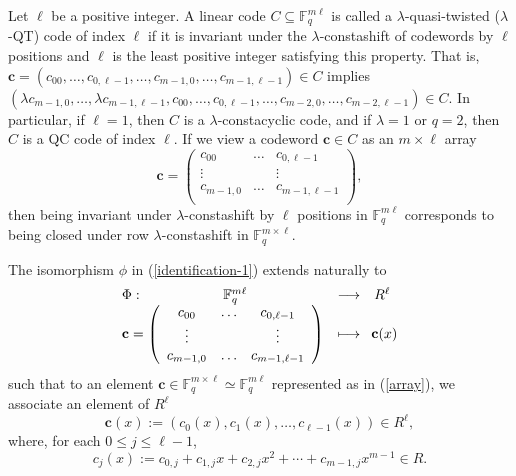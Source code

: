 \documentclass[11pt]{amsart}
\theoremstyle{plain}
\theoremstyle{definition}
\numberwithin{equation}{section}
\newcommand{\Fq}{\mathbb{F}_{q}}
\newcommand{\F}{{\mathbb F}}
\begin{document}
Let $\ell$ be a positive integer. A linear code $C\subseteq\Fq^{m\ell}$ is called a $\lambda$-quasi-twisted ($\lambda$-QT) code of index $\ell$ if it is invariant under the $\lambda$-constashift of codewords by $\ell$ positions and $\ell$ is the least positive integer satisfying this property. That is, $\mathbf{c}=(c_{00} ,\ldots, c_{0,\ell-1}, \ldots, c_{m-1,0}, \ldots, c_{m-1,\ell-1})\in C$ implies $(\lambda c_{m-1,0}, \ldots, \lambda c_{m-1,\ell-1}, c_{00} ,\ldots, c_{0,\ell-1}, \ldots, c_{m-2,0}, \ldots, c_{m-2,\ell-1})\in C$. In particular, if $\ell=1$, then $C$ is a $\lambda$-constacyclic code, and if $\lambda = 1$ or $q=2$, then $C$ is a QC code of index $\ell$. If we view a codeword $\mathbf{c}\in C$ as an $m \times \ell$ array
\begin{equation}\label{array}
\mathbf{c}=\left(
  \begin{array}{ccc}
    c_{00} & \ldots & c_{0,\ell-1} \\
    \vdots &  & \vdots \\
    c_{m-1,0} & \ldots & c_{m-1,\ell-1} \\
  \end{array}
\right),\end{equation} then being invariant under $\lambda$-constashift by $\ell$ positions in $\Fq^{m\ell}$ corresponds to being closed under row $\lambda$-constashift in $\Fq^{m\times\ell}$.

The isomorphism $\phi$ in (\ref{identification-1}) extends naturally to
\begin{equation}
\begin{array}{lll} \label{identification-2}
\Phi: \hspace{2cm} \F_q^{m\ell} & \longrightarrow & R^\ell  \\
\mathbf{c}=\left(
  \begin{array}{ccc}
    c_{00} & \ldots & c_{0,\ell-1} \\
    \vdots &  & \vdots \\
    c_{m-1,0} & \ldots & c_{m-1,\ell-1} \\
  \end{array}
\right) & \longmapsto & \hspace{-2pt}\mathbf{c}(x)\\
\end{array}\\
\end{equation}
such that to an element $\mathbf{c}\in \Fq^{m\times \ell} \simeq \Fq^{m\ell}$ represented as in (\ref{array}), we associate an element of $R^\ell$ 
\begin{equation} \label{associate-1}
\mathbf{c}(x):=(c_0(x),c_1(x),\ldots ,c_{\ell-1}(x)) \in R^\ell ,
\end{equation}
where, for each $0\leq j \leq \ell-1$, 
\begin{equation}\label{columns} 
c_j(x):= c_{0,j}+c_{1,j}x+c_{2,j}x^2+\cdots + c_{m-1,j}x^{m-1} \in R .
\end{equation} 
\end{document}
